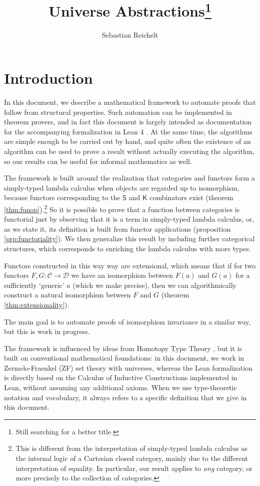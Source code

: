 \documentclass[a4paper]{article}
\title{Universe Abstractions\footnote{Still searching for a better title.}}
\author{Sebastian Reichelt}
\theoremstyle{definition}
\theoremstyle{remark}
\newcommand{\C}{\mathcal{C}}
\newcommand{\D}{\mathcal{D}}
\newcommand{\nm}{\mathsf}
\begin{document}
\maketitle

\section{Introduction}

In this document, we describe a mathematical framework to automate proofs that follow from structural
properties. Such automation can be implemented in theorem provers, and in fact this document is
largely intended as documentation for the accompanying formalization in Lean 4 \cite{lean4}.
At the same time, the algorithms are simple enough to be carried out by hand, and quite often the
existence of an algorithm can be used to prove a result without actually executing the algorithm, so
our results can be useful for informal mathematics as well.

The framework is built around the realization that categories and functors form a simply-typed lambda
calculus \cite{simply-typed-lambda-calculus} when objects are regarded up to isomorphism, because
functors corresponding to the $\nm{S}$ and $\nm{K}$ combinators exist (theorem
\ref{thm:funop}).\footnote{This is different from the interpretation of simply-typed lambda calculus
as the internal logic of a Cartesian closed category, mainly due to the different interpretation of
equality. In particular, our result applies to \emph{any} category, or more precisely to the
collection of categories.}
So it is possible to prove that a function between categories is functorial just by observing that it
is a term in simply-typed lambda calculus, or, as we state it, its definition is built from functor
applications (proposition \ref{prp:functoriality}). We then generalize this result by including
further categorical structures, which corresponds to enriching the lambda calculus with more types.

Functors constructed in this way way are extensional, which means that if for two functors
$F,G : \C \to \D$ we have an isomorphism between $F(a)$ and $G(a)$ for a sufficiently `generic' $a$
(which we make precise), then we can algorithmically construct a natural isomorphism between $F$ and
$G$ (theorem \ref{thm:extensionality}).

The main goal is to automate proofs of isomorphism invariance in a similar way, but this is work in
progress.

The framework is influenced by ideas from Homotopy Type Theory \cite{hottbook}, but it is built on
conventional mathematical foundations: in this document, we work in Zermelo-Fraenkel (ZF) set
theory with universes, whereas the Lean formalization is directly based on the Calculus of Inductive
Constructions implemented in Lean, without assuming any additional axioms. When we use
type-theoretic notation and vocabulary, it always refers to a specific definition that we give in
this document.
\end{document}

